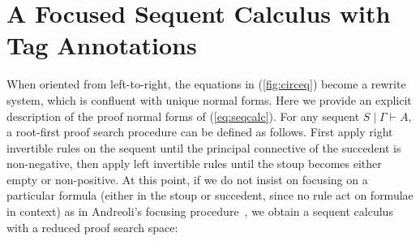 \documentclass[submission,copyright,creativecommons]{eptcs}
\theoremstyle{definition}
\begin{document}
\section{A Focused Sequent Calculus with Tag Annotations}\label{sec:focusing}
When oriented from left-to-right, the equations in (\ref{fig:circeq}) become a  rewrite system, which is confluent with unique normal forms. Here we provide an explicit description of the proof normal forms of (\ref{eq:seqcalc}).
For any sequent $S \mid \Gamma \vdash A$, a root-first proof search procedure can be defined as follows. First apply right invertible rules on the sequent until the principal connective of the succedent is non-negative, then apply left invertible rules until the stoup becomes either empty or non-positive. At this point, if we do not insist on focusing on a particular formula (either in the stoup or succedent, since no rule act on formulae in context) as in Andreoli's focusing procedure~\cite{andreoli:logic:1992}, we obtain a sequent calculus with a reduced proof search space:
\end{document}

